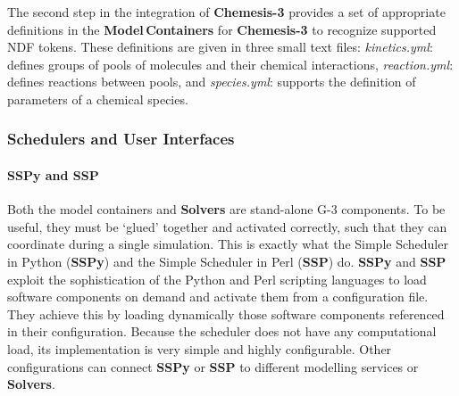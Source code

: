 \documentclass{article}
\begin{document}





The second step in the integration of {\bf Chemesis-3} provides a set
of appropriate definitions in the {\bf Model\,Containers} for {\bf Chemesis-3}
to recognize supported NDF tokens. These definitions are
given in three small text files: {\it kinetics.yml}: 
defines groups of pools of molecules and their chemical
interactions, {\it reaction.yml}: defines reactions
between pools, and {\it species.yml}: supports the definition of
parameters of a chemical species.


\subsubsection{Schedulers and User Interfaces}

\paragraph{SSPy and SSP}

Both the model containers and {\bf Solvers} are stand-alone G-3
components. To be useful, they must be `glued' together and activated
correctly, such that they can coordinate during a single simulation.
This is exactly what the Simple Scheduler in Python ({\bf SSPy}) and
the Simple Scheduler in Perl ({\bf SSP}) do.
{\bf SSPy} and {\bf SSP} exploit the sophistication of the
Python and Perl scripting languages to load software components on demand and
activate them from a configuration file. They achieve this by loading
dynamically those software components referenced in their configuration.
Because the scheduler does not have any computational load,
its implementation is very simple and highly configurable. Other
configurations can connect {\bf SSPy} or {\bf SSP} to different modelling services or
{\bf Solvers}.
\end{document}
